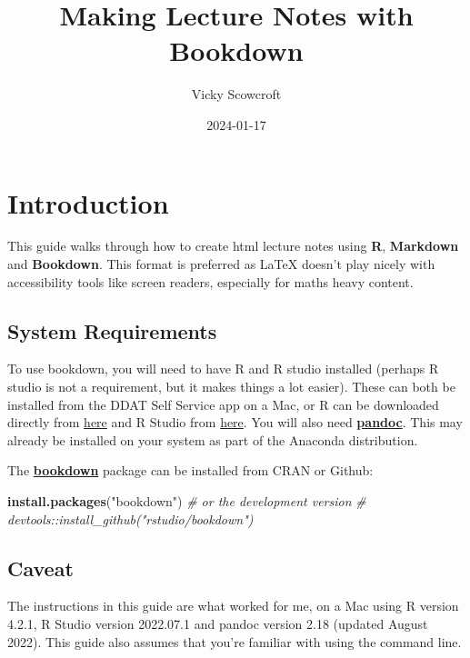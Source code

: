 \documentclass[
]{book}
\title{Making Lecture Notes with Bookdown}
\author{Vicky Scowcroft}
\date{2024-01-17}
\newenvironment{Shaded}{\begin{snugshade}}{\end{snugshade}}
\newcommand{\CommentTok}[1]{\textcolor[rgb]{0.56,0.35,0.01}{\textit{#1}}}
\newcommand{\FunctionTok}[1]{\textcolor[rgb]{0.13,0.29,0.53}{\textbf{#1}}}
\newcommand{\NormalTok}[1]{#1}
\newcommand{\StringTok}[1]{\textcolor[rgb]{0.31,0.60,0.02}{#1}}
\begin{document}
\maketitle

{
\setcounter{tocdepth}{1}
\tableofcontents
}
\chapter*{Introduction}\label{introduction}

This guide walks through how to create html lecture notes using \textbf{R}, \textbf{Markdown} and \textbf{Bookdown}. This format is preferred as LaTeX doesn't play nicely with accessibility tools like screen readers, especially for maths heavy content.

\section*{System Requirements}\label{system-requirements}

To use bookdown, you will need to have R and R studio installed (perhaps R studio is not a requirement, but it makes things a lot easier). These can both be installed from the DDAT Self Service app on a Mac, or R can be downloaded directly from \href{https://cran.r-project.org/}{here} and R Studio from \href{https://rstudio.com/products/rstudio/download/}{here}. You will also need \href{https://pandoc.org/index.html}{\textbf{pandoc}}. This may already be installed on your system as part of the Anaconda distribution.

The \href{https://bookdown.org/yihui/bookdown/}{\textbf{bookdown}} package can be installed from CRAN or Github:

\begin{Shaded}
\begin{Highlighting}[]
\FunctionTok{install.packages}\NormalTok{(}\StringTok{"bookdown"}\NormalTok{)}
\CommentTok{\# or the development version}
\CommentTok{\# devtools::install\_github("rstudio/bookdown")}
\end{Highlighting}
\end{Shaded}

\section*{Caveat}\label{caveat}

The instructions in this guide are what worked for me, on a Mac using R version 4.2.1, R Studio version 2022.07.1 and pandoc version 2.18 (updated August 2022). This guide also assumes that you're familiar with using the command line.
\end{document}
